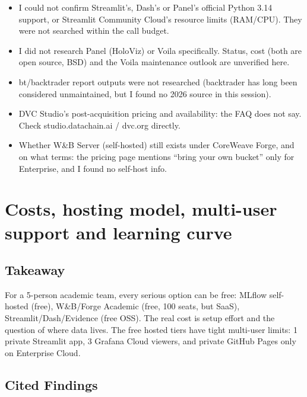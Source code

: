 \documentclass{article}
\begin{document}
\begin{itemize}

\item I could not confirm Streamlit's, Dash's or Panel's official Python 3.14 support, or Streamlit Community Cloud's resource limits (RAM/\allowbreak{}CPU). They were not searched within the call budget.

\item I did not research Panel (HoloViz) or Voila specifically. Status, cost (both are open source, BSD) and the Voila maintenance outlook are unverified here.

\item bt/\allowbreak{}backtrader report outputs were not researched (backtrader has long been considered unmaintained, but I found no 2026 source in this session).

\item DVC Studio's post-acquisition pricing and availability: the FAQ does not say. Check studio.datachain.ai /\allowbreak{} dvc.org directly.

\item Whether W\&B Server (self-hosted) still exists under CoreWeave Forge, and on what terms: the pricing page mentions ``bring your own bucket'' only for Enterprise, and I found no self-host info.

\end{itemize}

\section{Costs, hosting model, multi-user support and learning curve}

\subsection{Takeaway}

For a 5-person academic team, every serious option can be free: MLflow self-hosted (free), W\&B/\allowbreak{}Forge Academic (free, 100 seats, but SaaS), Streamlit/\allowbreak{}Dash/\allowbreak{}Evidence (free OSS). The real cost is setup effort and the question of where data lives. The free hosted tiers have tight multi-user limits: 1 private Streamlit app, 3 Grafana Cloud viewers, and private GitHub Pages only on Enterprise Cloud.

\subsection{Cited Findings}
\end{document}
